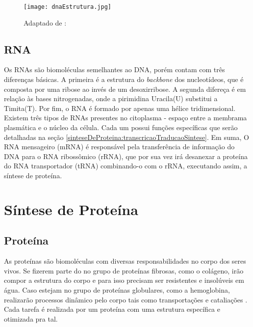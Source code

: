 \begin{figure}[h]
    \centering
    \texttt{[image: dnaEstrutura.jpg]}
    \caption{Adaptado de : \cite{dnadiscovery08} }
    \label{fig:EstruturasDoDNA}
\end{figure} 


\subsection{RNA} \label{aceidosNucleicos:rna}

\indent Os RNAs são biomoléculas semelhantes ao DNA, porém contam com três diferenças básicas. A primeira é a estrutura do \textit{backbone} dos nucleotídeos, que é composta por uma ribose ao invés de um desoxirribose. A segunda difereça é em relação às bases nitrogenadas, onde a pirimidina Uracila(U) substitui a Timita(T). 
Por fim, o RNA é formado por apenas uma hélice tridimensional. \\

\indent Existem três tipos de RNAs presentes no citoplasma - espaço entre a membrama plasmática e o núcleo da célula. 
Cada um possui funções específicas que serão detalhadas na seção \ref{sinteseDeProteina:transcricaoTraducaoSintese}. Em suma, O RNA mensageiro (mRNA) é responsável pela transferência de informação do DNA para o RNA ribossômico (rRNA), que por sua vez irá desanexar a proteína do RNA transportador (tRNA) combinando-o com o rRNA, executando assim, a síntese de proteína. \\




\section{Síntese de Proteína} \label{sinteseDeProteina}



\subsection{Proteína} \label{sinteseDeProteina:proteina}

\indent As proteínas são biomoléculas com diversas responsabilidades no corpo dos seres vivos. 
Se fizerem parte do no grupo de proteínas fibrosas, como o colágeno, irão compor a estrutura do corpo e para isso precisam ser resistentes e insolúveis em água. Caso estejam no grupo de proteínas globulares, como a hemoglobina, realizarão processos dinâmico pelo corpo tais como transportações e cataliações \cite{profangela11}.  Cada tarefa é realizada por um proteína com uma estrutura específica e otimizada pra tal. \\

